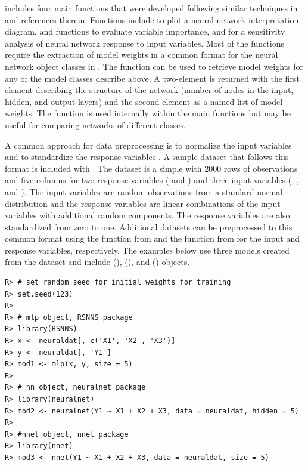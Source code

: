 \documentclass[article,shortnames]{jss}\usepackage[]{graphicx}\usepackage[]{color}
\makeatletter
\newenvironment{kframe}{%
 \def\at@end@of@kframe{}%
 \ifinner\ifhmode%
  \def\at@end@of@kframe{\end{minipage}}%
  \begin{minipage}{\columnwidth}%
 \fi\fi%
 \def\FrameCommand##1{\hskip\@totalleftmargin \hskip-\fboxsep
 \colorbox{shadecolor}{##1}\hskip-\fboxsep
     \hskip-\linewidth \hskip-\@totalleftmargin \hskip\columnwidth}%
 \MakeFramed {\advance\hsize-\width
   \@totalleftmargin\z@ \linewidth\hsize
   \@setminipage}}%
 {\par\unskip\endMakeFramed%
 \at@end@of@kframe}
\newenvironment{knitrout}{}{} %
\makeatother
\begin{document}
 includes four main functions that were developed following similar techniques in \citet{Olden02} and references therein.  Functions include  to plot a neural network interpretation diagram,  and  functions to evaluate variable importance, and  for a sensitivity analysis of neural network response to input variables.  Most of the functions require the extraction of model weights in a common format for the neural network object classes in .  The  function can be used to retrieve model weights for any of the model classes describe above.  A two-element  is returned with the first element describing the structure of the network (number of nodes in the input, hidden, and output layers) and the second element as a named list of model weights.  The function is used internally within the main functions but may be useful for comparing networks of different classes.

A common approach for data preprocessing is to normalize the input variables and to standardize the response variables \citep{Lek00,Olden02}.  A sample dataset that follows this format is included with .  The  dataset is a simple  with 2000 rows of observations and five columns for two response variables ( and ) and three input variables (, , and ).  The input variables are random observations from a standard normal distribution and the response variables are linear combinations of the input variables with additional random components.  The response variables are also standardized from zero to one.  Additional datasets can be preprocessed to this common format using the  function from  and the  function from  for the input and response variables, respectively.  The examples below use three models created from the  dataset and include  (),  (), and  () objects.


\begin{knitrout}
\color{fgcolor}\begin{kframe}
\begin{verbatim}
R> # set random seed for initial weights for training
R> set.seed(123)
R> 
R> # mlp object, RSNNS package
R> library(RSNNS)
R> x <- neuraldat[, c('X1', 'X2', 'X3')]
R> y <- neuraldat[, 'Y1']
R> mod1 <- mlp(x, y, size = 5)
R> 
R> # nn object, neuralnet package
R> library(neuralnet)
R> mod2 <- neuralnet(Y1 ~ X1 + X2 + X3, data = neuraldat, hidden = 5)
R> 
R> #nnet object, nnet package
R> library(nnet)
R> mod3 <- nnet(Y1 ~ X1 + X2 + X3, data = neuraldat, size = 5)
\end{verbatim}
\end{kframe}
\end{knitrout}
\end{document}
